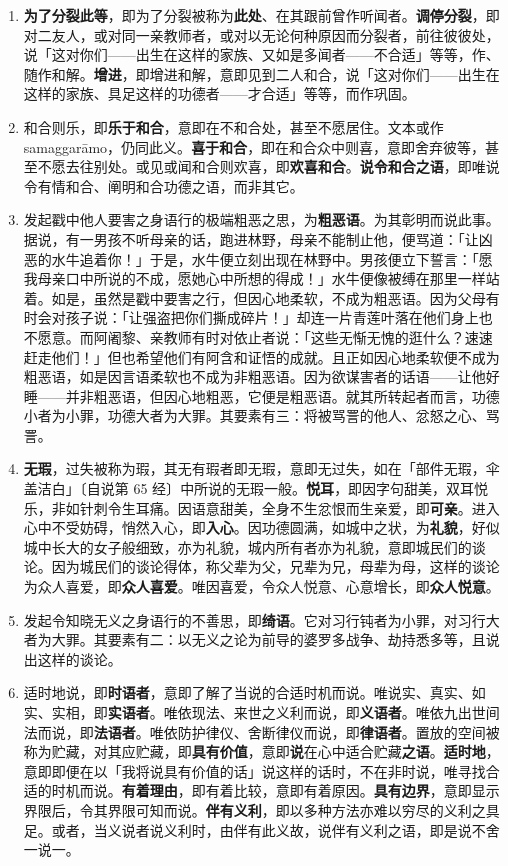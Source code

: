 \begin{enumerate}
\item \textbf{为了分裂此等}，即为了分裂被称为\textbf{此处}、在其跟前曾作听闻者。\textbf{调停分裂}，即对二友人，或对同一亲教师者，或对以无论何种原因而分裂者，前往彼彼处，说「这对你们——出生在这样的家族、又如是多闻者——不合适」等等，作、随作和解。\textbf{增进}，即增进和解，意即见到二人和合，说「这对你们——出生在这样的家族、具足这样的功德者——才合适」等等，而作巩固。
\item 和合则乐，即\textbf{乐于和合}，意即在不和合处，甚至不愿居住。文本或作 samaggarāmo，仍同此义。\textbf{喜于和合}，即在和合众中则喜，意即舍弃彼等，甚至不愿去往别处。或见或闻和合则欢喜，即\textbf{欢喜和合}。\textbf{说令和合之语}，即唯说令有情和合、阐明和合功德之语，而非其它。
\item 发起戳中他人要害之身语行的极端粗恶之思，为\textbf{粗恶语}。为其彰明而说此事。据说，有一男孩不听母亲的话，跑进林野，母亲不能制止他，便骂道：「让凶恶的水牛追着你！」于是，水牛便立刻出现在林野中。男孩便立下誓言：「愿我母亲口中所说的不成，愿她心中所想的得成！」水牛便像被缚在那里一样站着。如是，虽然是戳中要害之行，但因心地柔软，不成为粗恶语。因为父母有时会对孩子说：「让强盗把你们撕成碎片！」却连一片青莲叶落在他们身上也不愿意。而阿阇黎、亲教师有时对依止者说：「这些无惭无愧的逛什么？速速赶走他们！」但也希望他们有阿含和证悟的成就。且正如因心地柔软便不成为粗恶语，如是因言语柔软也不成为非粗恶语。因为欲谋害者的话语——让他好睡——并非粗恶语，但因心地粗恶，它便是粗恶语。就其所转起者而言，功德小者为小罪，功德大者为大罪。其要素有三：将被骂詈的他人、忿怒之心、骂詈。
\item \textbf{无瑕}，过失被称为瑕，其无有瑕者即无瑕，意即无过失，如在「部件无瑕，伞盖洁白」{\bluefootnotesize 〔自说第 65 经〕}中所说的无瑕一般。\textbf{悦耳}，即因字句甜美，双耳悦乐，非如针刺令生耳痛。因语意甜美，全身不生忿恨而生亲爱，即\textbf{可亲}。进入心中不受妨碍，悄然入心，即\textbf{入心}。因功德圆满，如城中之状，为\textbf{礼貌}，好似城中长大的女子般细致，亦为礼貌，城内所有者亦为礼貌，意即城民们的谈论。因为城民们的谈论得体，称父辈为父，兄辈为兄，母辈为母，这样的谈论为众人喜爱，即\textbf{众人喜爱}。唯因喜爱，令众人悦意、心意增长，即\textbf{众人悦意}。
\item 发起令知晓无义之身语行的不善思，即\textbf{绮语}。它对习行钝者为小罪，对习行大者为大罪。其要素有二：以无义之论为前导的婆罗多战争、劫持悉多等，且说出这样的谈论。
\item 适时地说，即\textbf{时语者}，意即了解了当说的合适时机而说。唯说实、真实、如实、实相，即\textbf{实语者}。唯依现法、来世之义利而说，即\textbf{义语者}。唯依九出世间法而说，即\textbf{法语者}。唯依防护律仪、舍断律仪而说，即\textbf{律语者}。置放的空间被称为贮藏，对其应贮藏，即\textbf{具有价值}，意即\textbf{说}在心中适合贮藏\textbf{之语}。\textbf{适时地}，意即即便在以「我将说具有价值的话」说这样的话时，不在非时说，唯寻找合适的时机而说。\textbf{有着理由}，即有着比较，意即有着原因。\textbf{具有边界}，意即显示界限后，令其界限可知而说。\textbf{伴有义利}，即以多种方法亦难以穷尽的义利之具足。或者，当义说者说义利时，由伴有此义故，说伴有义利之语，即是说不舍一说一。\end{enumerate}

